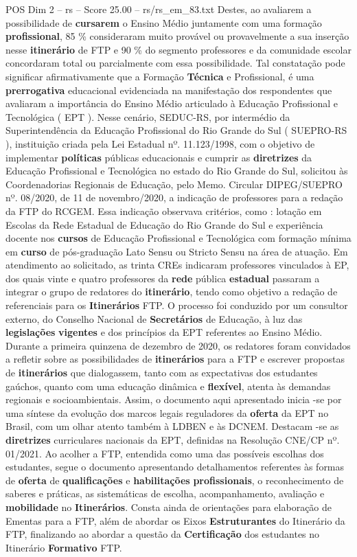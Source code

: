 \begin{textsample}{POS Dim 2 – rs – Score 25.00 – rs/rs\_em\_83.txt}
Destes, ao avaliarem a possibilidade de \textbf{cursarem} o Ensino Médio juntamente com uma formação \textbf{profissional}, 85 \% consideraram muito provável ou provavelmente a sua inserção nesse \textbf{itinerário} de FTP e 90 \% do segmento professores e da comunidade escolar concordaram total ou parcialmente com essa possibilidade.
Tal constatação pode significar afirmativamente que a Formação \textbf{Técnica} e Profissional, é uma \textbf{prerrogativa} educacional evidenciada na manifestação dos respondentes que avaliaram a importância do Ensino Médio articulado à Educação Profissional e Tecnológica ( EPT ).
Nesse cenário, SEDUC-RS, por intermédio da Superintendência da Educação Profissional do Rio Grande do Sul ( SUEPRO-RS ), instituição criada pela Lei Estadual nº. 11.123/1998, com o objetivo de implementar \textbf{políticas} públicas educacionais e cumprir as \textbf{diretrizes} da Educação Profissional e Tecnológica no estado do Rio Grande do Sul, solicitou às Coordenadorias Regionais de Educação, pelo Memo.
Circular DIPEG/SUEPRO nº. 08/2020, de 11 de novembro/2020, a indicação de professores para a redação da FTP do RCGEM.
Essa indicação observava critérios, como : lotação em Escolas da Rede Estadual de Educação do Rio Grande do Sul e experiência docente nos \textbf{cursos} de Educação Profissional e Tecnológica com formação mínima em \textbf{curso} de pós-graduação Lato Sensu ou Stricto Sensu na área de atuação.
Em atendimento ao solicitado, as trinta CREs indicaram professores vinculados à EP, dos quais vinte e quatro professores da \textbf{rede} pública \textbf{estadual} passaram a integrar o grupo de redatores do \textbf{itinerário}, tendo como objetivo a redação de referenciais para os \textbf{Itinerários} FTP.
O processo foi conduzido por um consultor externo, do Conselho Nacional de \textbf{Secretários} de Educação, à luz das \textbf{legislações} \textbf{vigentes} e dos princípios da EPT referentes ao Ensino Médio.
Durante a primeira quinzena de dezembro de 2020, os redatores foram convidados a refletir sobre as possibilidades de \textbf{itinerários} para a FTP e escrever propostas de \textbf{itinerários} que dialogassem, tanto com as expectativas dos estudantes gaúchos, quanto com uma educação dinâmica e \textbf{flexível}, atenta às demandas regionais e socioambientais.
Assim, o documento aqui apresentado inicia -se por uma síntese da evolução dos marcos legais reguladores da \textbf{oferta} da EPT no Brasil, com um olhar atento também à LDBEN e às DCNEM.
Destacam -se as \textbf{diretrizes} curriculares nacionais da EPT, definidas na Resolução CNE/CP nº. 01/2021.
Ao acolher a FTP, entendida como uma das possíveis escolhas dos estudantes, segue o documento apresentando detalhamentos referentes às formas de \textbf{oferta} de \textbf{qualificações} e \textbf{habilitações} \textbf{profissionais}, o reconhecimento de saberes e práticas, as sistemáticas de escolha, acompanhamento, avaliação e \textbf{mobilidade} no \textbf{Itinerários}.
Consta ainda de orientações para elaboração de Ementas para a FTP, além de abordar os Eixos \textbf{Estruturantes} do Itinerário da FTP, finalizando ao abordar a questão da \textbf{Certificação} dos estudantes no Itinerário \textbf{Formativo} FTP.


\end{textsample}
